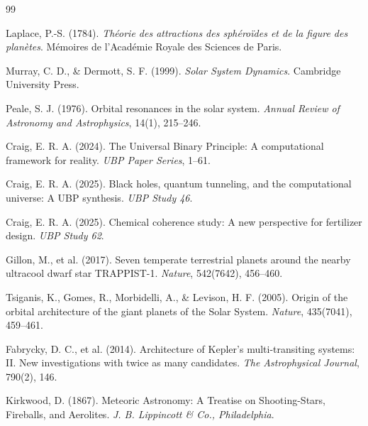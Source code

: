 \documentclass[12pt,a4paper]{article}
\begin{document}
\begin{thebibliography}{99}

Laplace, P.-S. (1784). \textit{Théorie des attractions des sphéroïdes et de la figure des planètes}. Mémoires de l'Académie Royale des Sciences de Paris.

Murray, C. D., \& Dermott, S. F. (1999). \textit{Solar System Dynamics}. Cambridge University Press.

Peale, S. J. (1976). Orbital resonances in the solar system. \textit{Annual Review of Astronomy and Astrophysics}, 14(1), 215--246.

Craig, E. R. A. (2024). The Universal Binary Principle: A computational framework for reality. \textit{UBP Paper Series}, 1--61.

Craig, E. R. A. (2025). Black holes, quantum tunneling, and the computational universe: A UBP synthesis. \textit{UBP Study 46}.

Craig, E. R. A. (2025). Chemical coherence study: A new perspective for fertilizer design. \textit{UBP Study 62}.

Gillon, M., et al. (2017). Seven temperate terrestrial planets around the nearby ultracool dwarf star TRAPPIST-1. \textit{Nature}, 542(7642), 456--460.

Tsiganis, K., Gomes, R., Morbidelli, A., \& Levison, H. F. (2005). Origin of the orbital architecture of the giant planets of the Solar System. \textit{Nature}, 435(7041), 459--461.

Fabrycky, D. C., et al. (2014). Architecture of Kepler's multi-transiting systems: II. New investigations with twice as many candidates. \textit{The Astrophysical Journal}, 790(2), 146.

Kirkwood, D. (1867). Meteoric Astronomy: A Treatise on Shooting-Stars, Fireballs, and Aerolites. \textit{J. B. Lippincott \& Co., Philadelphia}.

\end{thebibliography}
\end{document}
